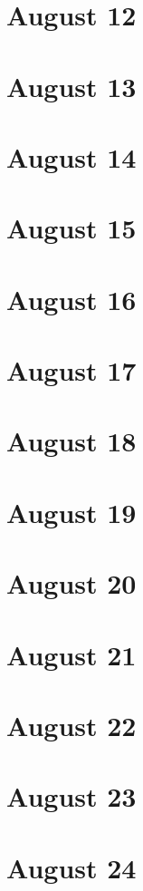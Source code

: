 \section{August 12}

\section{August 13}

\section{August 14}

\section{August 15}

\section{August 16}

\section{August 17}

\section{August 18}

\section{August 19}

\section{August 20}

\section{August 21}

\section{August 22}

\section{August 23}

\section{August 24}

